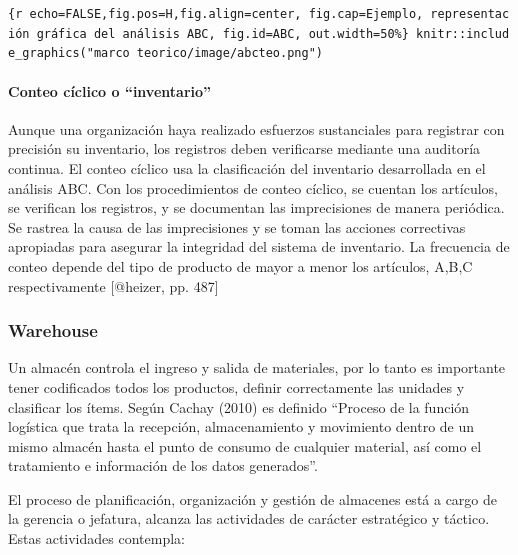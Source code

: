 \documentclass[11pt]{article}
\begin{document}
\texttt{\{r\ echo=FALSE,fig.pos=\textquotesingle{}H\textquotesingle{},fig.align=\textquotesingle{}center\textquotesingle{},\ fig.cap=\textquotesingle{}Ejemplo,\ representación\ gráfica\ del\ análisis\ ABC\textquotesingle{},\ fig.id=\textquotesingle{}ABC\textquotesingle{},\ out.width=\textquotesingle{}50\%\textquotesingle{}\}\ knitr::include\_graphics("marco\ teorico/image/abcteo.png")}

\hypertarget{conteo-cuxedclico-o-inventario}{%
\paragraph{Conteo cíclico o
``inventario''}\label{conteo-cuxedclico-o-inventario}}

Aunque una organización haya realizado esfuerzos sustanciales para
registrar con precisión su inventario, los registros deben verificarse
mediante una auditoría continua. El conteo cíclico usa la clasificación
del inventario desarrollada en el análisis ABC. Con los procedimientos
de conteo cíclico, se cuentan los artículos, se verifican los registros,
y se documentan las imprecisiones de manera periódica. Se rastrea la
causa de las imprecisiones y se toman las acciones correctivas
apropiadas para asegurar la integridad del sistema de inventario. La
frecuencia de conteo depende del tipo de producto de mayor a menor los
artículos, A,B,C respectivamente {[}@heizer, pp. 487{]}

\hypertarget{warehouse}{%
\subsubsection{Warehouse}\label{warehouse}}

Un almacén controla el ingreso y salida de materiales, por lo tanto es
importante tener codificados todos los productos, definir correctamente
las unidades y clasificar los ítems. Según Cachay (2010) es definido
``Proceso de la función logística que trata la recepción, almacenamiento
y movimiento dentro de un mismo almacén hasta el punto de consumo de
cualquier material, así como el tratamiento e información de los datos
generados''.

El proceso de planificación, organización y gestión de almacenes está a
cargo de la gerencia o jefatura, alcanza las actividades de carácter
estratégico y táctico. Estas actividades contempla:
\end{document}
